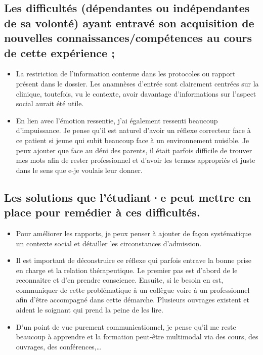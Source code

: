 \subsection{Les difficultés (dépendantes ou indépendantes de sa volonté) ayant entravé son acquisition de nouvelles connaissances/compétences au cours de cette expérience ;}

\begin{itemize}[label=\textbullet]
    \item La restriction de l’information contenue dans les protocoles ou rapport présent dans le dossier. Les anamnèses d’entrée sont clairement centrées sur la clinique, toutefois, vu le contexte, avoir davantage d’informations sur l’aspect social aurait été utile.
    \item En lien avec l’émotion ressentie, j’ai également ressenti beaucoup d’impuissance. Je pense qu’il est naturel d’avoir un réflexe correcteur face à ce patient si jeune qui subit beaucoup face à un environnement nuisible. Je peux ajouter que face au déni des parents, il était parfois difficile de trouver mes mots afin de rester professionnel et d’avoir les termes appropriés et juste dans le sens que e-je voulais leur donner.
\end{itemize}

\subsection{Les solutions que l’étudiant·e peut mettre en place pour remédier à ces difficultés.}

\begin{itemize}[label=\textbullet]
    \item Pour améliorer les rapports, je peux penser à ajouter de façon systématique un contexte social et détailler les circonstances d’admission. 
    \item Il est important de déconstruire ce réflexe qui parfois entrave la bonne prise en charge et la relation thérapeutique. Le premier pas est d’abord de le reconnaitre et d’en prendre conscience. Ensuite, si le besoin en est, communiquer de cette problématique à un collègue voire à un professionnel afin d’être accompagné dans cette démarche. Plusieurs ouvrages existent et aident le soignant qui prend la peine de les lire. 
    \item D’un point de vue purement communicationnel, je pense qu’il me reste beaucoup à apprendre et la formation peut-être multimodal via des cours, des ouvrages, des conférences,…
    \end{itemize}


